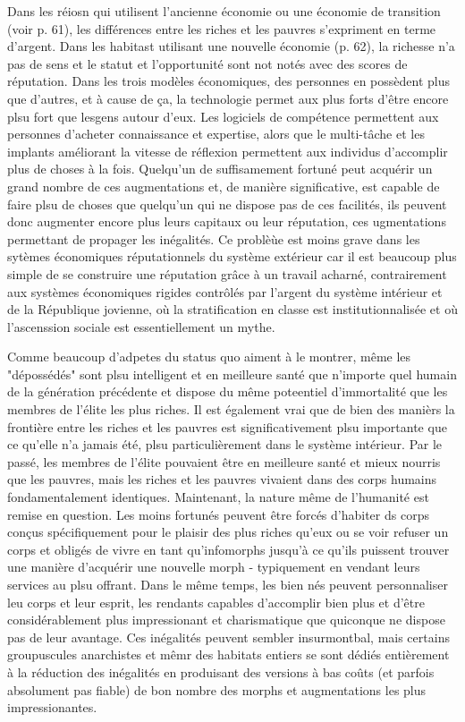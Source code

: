 Dans les réiosn qui utilisent l'ancienne économie ou une économie de transition (voir p. 61), les différences entre les riches et les pauvres s'expriment en terme d'argent. Dans les habitast utilisant une nouvelle économie (p. 62), la richesse n'a pas de sens et le statut et l'opportunité sont not notés avec des scores de réputation. Dans les trois modèles économiques, des personnes en possèdent plus que d'autres, et à cause de ça, la technologie permet aux plus forts d'être encore plsu fort que lesgens autour d'eux. Les logiciels de compétence permettent aux personnes d'acheter connaissance et expertise, alors que le multi-tâche et les implants améliorant la vitesse de réflexion permettent aux individus d'accomplir plus de choses à la fois. Quelqu'un de suffisamement fortuné peut acquérir un grand nombre de ces augmentations et, de manière significative, est capable de faire plsu de choses que quelqu'un qui ne dispose pas de ces facilités, ils peuvent donc augmenter encore plus leurs capitaux ou leur réputation, ces ugmentations permettant de propager les inégalités. Ce problèùe est moins grave dans les sytèmes économiques réputationnels du système extérieur car il est beaucoup plus simple de se construire une réputation grâce à un travail acharné, contrairement aux systèmes économiques rigides contrôlés par l'argent du système intérieur et de la République jovienne, où la stratification en classe est institutionnalisée et où l'ascenssion sociale est essentiellement un mythe. 

Comme beaucoup d'adpetes du status quo aiment à le montrer, même les "dépossédés" sont plsu intelligent et en meilleure santé que n'importe quel humain de la génération précédente et dispose du même poteentiel d'immortalité que les membres de l'élite les plus riches. Il est également vrai que de bien des manièrs la frontière entre les riches et les pauvres est significativement plsu importante que ce qu'elle n'a jamais été, plsu particulièrement dans le système intérieur. Par le passé, les membres de l'élite pouvaient être en meilleure santé et mieux nourris que les pauvres, mais les riches et les pauvres vivaient dans des corps humains fondamentalement identiques. Maintenant, la nature même de l'humanité est remise en question. Les moins fortunés peuvent être forcés d'habiter ds corps conçus spécifiquement pour le plaisir des plus riches qu'eux ou se voir refuser un corps et obligés de vivre en tant qu'infomorphs jusqu'à ce qu'ils puissent trouver une manière d'acquérir une nouvelle morph - typiquement en vendant leurs services au plsu offrant. Dans le même temps, les bien nés peuvent personnaliser leu corps et leur esprit, les rendants capables d'accomplir bien plus et d'être considérablement plus impressionant et charismatique que quiconque ne dispose pas de leur avantage. Ces inégalités peuvent sembler insurmontbal, mais certains groupuscules anarchistes et mêmr des habitats entiers se sont dédiés entièrement à la réduction des inégalités en produisant des versions à bas coûts (et parfois absolument pas fiable) de bon nombre des morphs et augmentations les plus impressionantes. 


